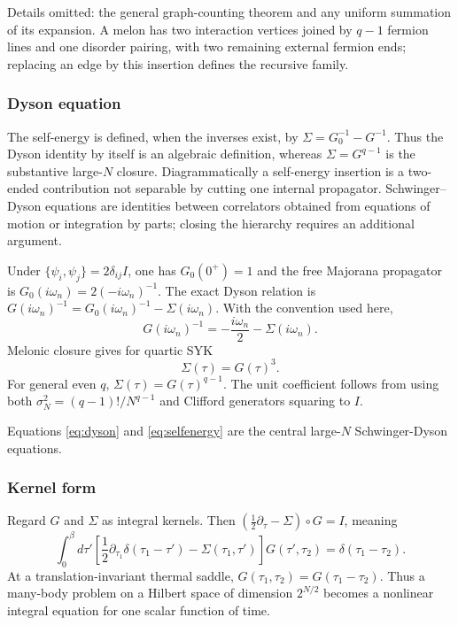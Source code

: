 \documentclass[11pt]{article}
\numberwithin{equation}{section}
\theoremstyle{exposition}
\theoremstyle{result}
\begin{document}
Details omitted: the general graph-counting theorem and any uniform summation of its expansion. A melon has two interaction vertices joined by $q-1$ fermion lines and one disorder pairing, with two remaining external fermion ends; replacing an edge by this insertion defines the recursive family.

\subsubsection{Dyson equation}


The self-energy is defined, when the inverses exist, by $\Sigma=G_0^{-1}-G^{-1}$. Thus the Dyson identity by itself is an algebraic definition, whereas $\Sigma=G^{q-1}$ is the substantive large-$N$ closure. Diagrammatically a self-energy insertion is a two-ended contribution not separable by cutting one internal propagator. Schwinger--Dyson equations are identities between correlators obtained from equations of motion or integration by parts; closing the hierarchy requires an additional argument.

Under $\{\psi_i,\psi_j\}=2\delta_{ij}I$, one has $G_0(0^+)=1$ and the free Majorana propagator is $G_0(i\omega_n)=2(-i\omega_n)^{-1}$. The exact Dyson relation is $G(i\omega_n)^{-1}=G_0(i\omega_n)^{-1}-\Sigma(i\omega_n)$. With the convention used here,
\begin{equation}
G(i\omega_n)^{-1}=-\frac{i\omega_n}{2}-\Sigma(i\omega_n).
\label{eq:dyson}
\end{equation}
Melonic closure gives for quartic SYK
\begin{equation}
\Sigma(\tau)=G(\tau)^3.
\label{eq:selfenergy}
\end{equation}
For general even $q$, $\Sigma(\tau)=G(\tau)^{q-1}$. The unit coefficient follows from using both $\sigma_N^2=(q-1)!/N^{q-1}$ and Clifford generators squaring to $I$.

Equations \eqref{eq:dyson} and \eqref{eq:selfenergy} are the central large-$N$ Schwinger-Dyson equations.

\subsubsection{Kernel form}

Regard $G$ and $\Sigma$ as integral kernels. Then $(\tfrac12\partial_\tau-\Sigma)\circ G=I$, meaning
\begin{equation*}
\int_0^\beta d\tau'
\left[
\frac12\partial_{\tau_1}\delta(\tau_1-\tau')-\Sigma(\tau_1,\tau')
\right]G(\tau',\tau_2)
=\delta(\tau_1-\tau_2).
\end{equation*}
At a translation-invariant thermal saddle, $G(\tau_1,\tau_2)=G(\tau_1-\tau_2)$. Thus a many-body problem on a Hilbert space of dimension $2^{N/2}$ becomes a nonlinear integral equation for one scalar function of time.
\end{document}

